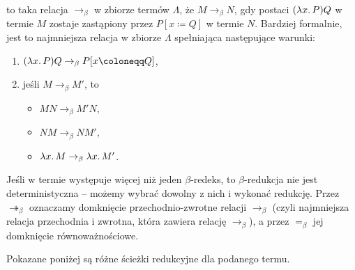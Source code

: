 \documentclass[polish,pretty,bibliography=totocnumbered]{angav}
\newcommand{\toto}{\twoheadrightarrow}
\begin{document}
 to taka relacja $\to_\beta$ w zbiorze termów $\Lambda$, że $M \to_\beta N$, gdy  postaci $(\lambda x\ldotp P)Q$ w termie $M$ zostaje zastąpiony przez $P[x \coloneqq Q]$ w termie $N$.
Bardziej formalnie, jest to najmniejsza relacja w zbiorze $\Lambda$ spełniająca następujące warunki:
\begin{enumerate}
    \item $(\lambda x\ldotp P)Q \to_\beta P[x \coloneqq Q]$,
    \item jeśli $M \to_\beta M'$, to
    \begin{itemize}[nosep]
        \item $MN \to_\beta M'N$,
        \item $NM \to_\beta NM'$,
        \item $\lambda x\ldotp M \to_\beta \lambda x\ldotp M'$.
    \end{itemize}
\end{enumerate}

Jeśli w termie występuje więcej niż jeden $\beta$-redeks, to $\beta$-redukcja nie jest deterministyczna -- możemy wybrać dowolny z nich i wykonać redukcję.
Przez $\toto_\beta$ oznaczamy domknięcie przechodnio-zwrotne relacji $\to_\beta$ (czyli najmniejsza relacja przechodnia i zwrotna, która zawiera relację $\to_\beta$), a przez $=_\beta$ jej domknięcie równoważnościowe.

\begin{example}
    \label{eq:beta-reduction}
    Pokazane poniżej są różne ścieżki redukcyjne dla podanego termu.
    \begin{center}
    \end{center}
\end{example}
\end{document}
